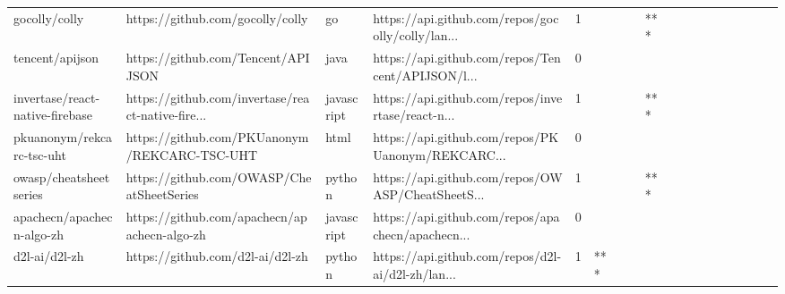 \begin{tabular}{llllrlllllllllllll}
gocolly/colly                                      &                   https://github.com/gocolly/colly &                go &  https://api.github.com/repos/gocolly/colly/lan... &       1 &         &        &           &            *** &                 &        &           &           &          &          &       &              &          \\
tencent/apijson                                    &                 https://github.com/Tencent/APIJSON &              java &  https://api.github.com/repos/Tencent/APIJSON/l... &       0 &         &        &           &                &                 &        &           &           &          &          &       &              &          \\
invertase/react-native-firebase                    &  https://github.com/invertase/react-native-fire... &        javascript &  https://api.github.com/repos/invertase/react-n... &       1 &         &        &           &            *** &                 &        &           &           &          &          &       &              &          \\
pkuanonym/rekcarc-tsc-uht                          &       https://github.com/PKUanonym/REKCARC-TSC-UHT &              html &  https://api.github.com/repos/PKUanonym/REKCARC... &       0 &         &        &           &                &                 &        &           &           &          &          &       &              &          \\
owasp/cheatsheetseries                             &          https://github.com/OWASP/CheatSheetSeries &            python &  https://api.github.com/repos/OWASP/CheatSheetS... &       1 &         &        &           &            *** &                 &        &           &           &          &          &       &              &          \\
apachecn/apachecn-algo-zh                          &       https://github.com/apachecn/apachecn-algo-zh &        javascript &  https://api.github.com/repos/apachecn/apachecn... &       0 &         &        &           &                &                 &        &           &           &          &          &       &              &          \\
d2l-ai/d2l-zh                                      &                   https://github.com/d2l-ai/d2l-zh &            python &  https://api.github.com/repos/d2l-ai/d2l-zh/lan... &       1 &     *** &        &           &                &                 &        &           &           &          &          &       &              &          \\

\end{tabular}
